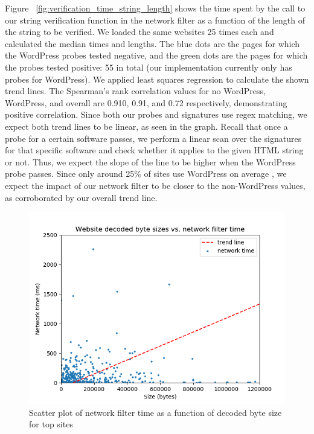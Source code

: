  Figure ~\ref{fig:verification_time_string_length} shows the time spent by the call to our string verification function in the network filter as a function of the length of the string to be verified. We loaded the same websites 25 times each and calculated the median times and lengths.  The blue dots are the pages for which the WordPress probes tested negative, and the green dots are the pages for which the probes tested positive: 55 in total (our implementation currently only has probes for WordPress). We applied least squares regression to calculate the shown trend lines. The Spearman's rank correlation values for no WordPress, WordPress, and overall are 0.910, 0.91, and 0.72 respectively, demonstrating positive correlation. Since both our probes and signatures use regex matching, we expect both trend lines to be linear, as seen in the graph. Recall that once a probe for a certain software passes, we perform a linear scan over the signatures for that specific software and check whether it applies to the given HTML string or not. Thus, we expect the slope of the line to be higher when the WordPress probe passes. Since only around 25\% of sites use WordPress on average \cite{w3techs}, we expect the impact of our network filter to be closer to the non-WordPress values, as corroborated by our overall trend line.

\begin{figure}[h]
	\includegraphics[scale=0.5]{results/byte_size_vs_filter_time}
	\caption{Scatter plot of network filter time as a function of decoded byte size for top sites}
	\label{fig:network_filter_decoded_size}
\end{figure}

